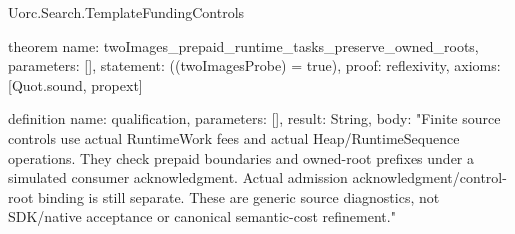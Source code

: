 \begin{lexlean}{Uorc.Search.TemplateFundingControls}
\begin{semanticmodule}
theorem{
  name: twoImages_prepaid_runtime_tasks_preserve_owned_roots,
  parameters: [],
  statement: ((twoImagesProbe) = true),
  proof: reflexivity{},
  axioms: [Quot.sound, propext]
}

definition{
  name: qualification,
  parameters: [],
  result: String,
  body: "Finite source controls use actual RuntimeWork fees and actual Heap/RuntimeSequence operations. They check prepaid boundaries and owned-root prefixes under a simulated consumer acknowledgment. Actual admission acknowledgment/control-root binding is still separate. These are generic source diagnostics, not SDK/native acceptance or canonical semantic-cost refinement."
}
\end{semanticmodule}
\end{lexlean}
